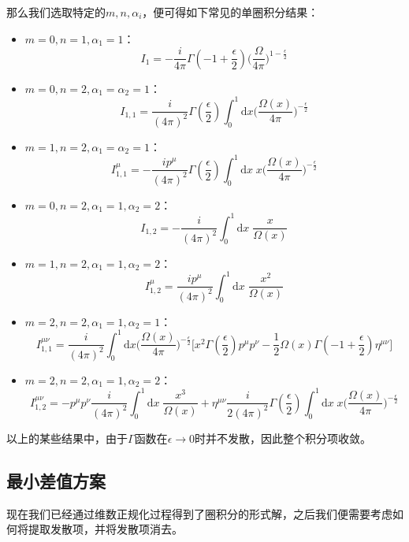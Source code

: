 那么我们选取特定的$m, n, \alpha_i$，便可得如下常见的单圈积分结果：
\begin{itemize}
	\item $m=0, n=1,\alpha_1=1$：\begin{equation}
	I_1=-\frac{i}{4\pi}\Gamma(-1+\frac{\epsilon}{2})\Big(\frac{\Omega}{4\pi}\Big)^{1-\frac{\epsilon}{2}}
	\end{equation}
	\item $m=0,n=2,\alpha_1=\alpha_2=1$：\begin{equation}
	I_{1,1}=\frac{i}{(4\pi)^{2}}\Gamma(\frac{\epsilon}{2})\int_0^1\mathrm{d}x\Big(\frac{\Omega(x)}{4\pi}\Big)^{-\frac{\epsilon}{2}}
	\end{equation}
	\item $m=1,n=2,\alpha_1=\alpha_2=1$：\begin{equation}
	I_{1,1}^\mu=-\frac{ip^\mu}{(4\pi)^2}\Gamma(\frac{\epsilon}{2})\int_0^1\mathrm{d}x\;x\Big(\frac{\Omega(x)}{4\pi}\Big)^{-\frac{\epsilon}{2}}
	\end{equation}
	\item $m=0,n=2,\alpha_1=1,\alpha_2=2$：\begin{equation}
	I_{1,2}=-\frac{i}{(4\pi)^2}\int_0^1\mathrm{d}x\;\frac{x}{\Omega(x)}
	\end{equation}
	\item $m=1,n=2,\alpha_1=1, \alpha_2=2$：\begin{equation}
	I_{1,2}^\mu=\frac{i p^\mu}{(4\pi)^2}\int_0^1\mathrm{d}x\;\frac{x^2}{\Omega(x)}
	\end{equation}
	\item $m=2,n=2,\alpha_1=1, \alpha_2=1$：\begin{equation}
	I_{1,1}^{\mu\nu}=\frac{i}{(4\pi)^2}\int_0^1\mathrm{d}x\Big(\frac{\Omega(x)}{4\pi}\Big)^{-\frac{\epsilon}{2}}\Big[x^2\Gamma(\frac{\epsilon}{2})p^\mu p^\nu-\frac{1}{2}\Omega(x)\Gamma(-1+\frac{\epsilon}{2})\eta^{\mu\nu}\Big]
\end{equation}
	\item $m=2,n=2,\alpha_1=1, \alpha_2=2$：\begin{equation}
	I_{1,2}^{\mu\nu}=-p^\mu p^\nu\frac{i}{(4\pi)^2}\int_0^1\mathrm{d}x\;\frac{x^3}{\Omega(x)}+\eta^{\mu\nu}\frac{i}{2(4\pi)^2}\Gamma(\frac{\epsilon}{2})\int_0^1\mathrm{d}x\;x\Big(\frac{\Omega(x)}{4\pi}\Big)^{-\frac{\epsilon}{2}}
	\end{equation}
\end{itemize}
以上的某些结果中，由于$\Gamma$函数在$\epsilon\rightarrow0$时并不发散，因此整个积分项收敛。
\subsection{最小差值方案}
现在我们已经通过维数正规化过程得到了圈积分的形式解，之后我们便需要考虑如何将提取发散项，并将发散项消去。

